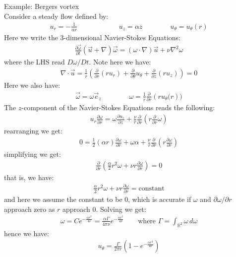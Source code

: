 \documentclass[11pt]{book}
\theoremstyle{break}
\theoremstyle{break}
\newcommand{\R}{\mathbb{R}}
\newcommand{\pd}{\partial}
\newcommand{\example}{\color{green}Example: \color{black}}
\begin{document}
\example Bergers vortex\\
Consider a steady flow defined by:
\begin{align*}
u_r = -\frac{1}{\alpha r} \qquad\qquad\qquad u_z = \alpha z \qquad\qquad u_{\theta} = u_{\theta}(r) 
\end{align*}
Here we write the $3$-dimensional Navier-Stokes Equations:
\begin{align*}
\frac{\pd \vec{\omega}}{\pd t}\left( \vec{u}+ \nabla \right) \vec{\omega} = (\omega \cdot \nabla ) \vec{u}+\nu \nabla^2 \omega
\end{align*}
where the LHS read $D\omega /Dt$. Note here we have:
\begin{align*}
\nabla \cdot \vec{u} =\frac{1}{r}\left( \frac{\pd}{\pd r}(ru_r) + \frac{\pd}{\pd \theta}u_\theta + \frac{\pd}{\pd z}(ru_z)\right) = 0
\end{align*}
Here we also have:
\begin{align*}
\vec{\omega} = \omega \vec{e}_z \qquad\qquad \omega = \frac{1}{r}\frac{\pd}{\pd r}\left( ru_{\theta}(r\right))
\end{align*}
The $z$-component of the Navier-Stokes Equations reads the following:
\begin{align*}
u_r \frac{\pd \omega}{\pd r}=\omega \frac{\pd u_z}{\pd z}+ \frac{\nu}{r}\frac{\pd}{\pd r}\left( r\frac{\pd}{\pd r}\omega\right)
\end{align*}
rearranging we get:
\begin{align*}
0 = \frac{1}{2}(\alpha r) \frac{\pd\omega}{\pd r} + \omega \alpha + \frac{\nu}{r}\frac{\pd}{\pd r}\left( r \frac{\pd \omega}{\pd r}\right)
\end{align*}
simplifying we get:
\begin{align*}
\frac{\pd}{\pd r}\left(\frac{\alpha}{2}r^2 \omega + \nu r\frac{\pd \omega}{\pd r} \right)=0
\end{align*}
that is, we have:
\begin{align*}
\frac{\alpha}{2}r^2 \omega + \nu r\frac{\pd\omega}{\pd r} = \text{constant}
\end{align*}
and here we assume the constant to be $0$, which is accurate if $\omega$ and $\pd \omega / \pd r$ approach zero as $r$ approach $0$. Solving we get:
\begin{align*}
\omega = Ce^{-\frac{\alpha r^2}{4\nu}} = \frac{\alpha \Gamma}{4\pi \nu}e^{-\frac{\alpha r^2}{4\nu}} \qquad \text{where }\Gamma = \int_{\R^2}\omega \, d\omega
\end{align*}
hence we have:
\begin{align*}
u_{\theta} = \frac{\Gamma}{2\pi r}\left( 1 - e^{-\frac{\alpha r^2}{4\nu}}\right)
\end{align*}
\end{document}
